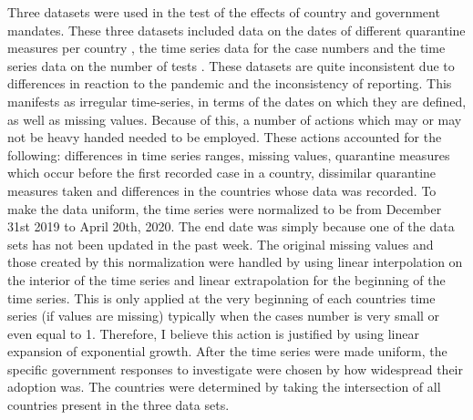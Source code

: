 Three datasets were used in the test of the effects of country and government mandates. These three datasets included
data on the dates of different quarantine measures per country \cite{govtresponse},  the time series data for the case numbers \cite{owid} and the time series data on the number of tests \cite{find}. These datasets are quite inconsistent due to differences in reaction to the pandemic and the inconsistency of reporting. This manifests as irregular time-series, in terms of the dates on which they are defined, as well as missing values. 
Because of this, a number of actions which may or may not be heavy handed needed to be employed.  
These actions accounted for the following: differences in time series ranges, missing values, quarantine measures which occur before the first recorded case in a country, dissimilar quarantine measures taken and differences in the countries whose data was recorded. 
To make the data uniform, the time series were normalized to be from December 31st 2019 to April 20th, 2020. The end date was simply because one of the data sets has not been updated in the past week. The original missing values and those created by this normalization were handled by using linear interpolation on the interior of the time series and linear extrapolation for the beginning of the time series. This is only applied at the very beginning of each countries time series (if values are missing) typically when the cases number is very small or even equal to 1. Therefore, I believe this action is justified by using linear expansion of exponential growth. After the time series were made uniform, the specific government responses to investigate
were chosen by how widespread their adoption was. The countries were determined by taking the intersection of all countries present in the three data sets.